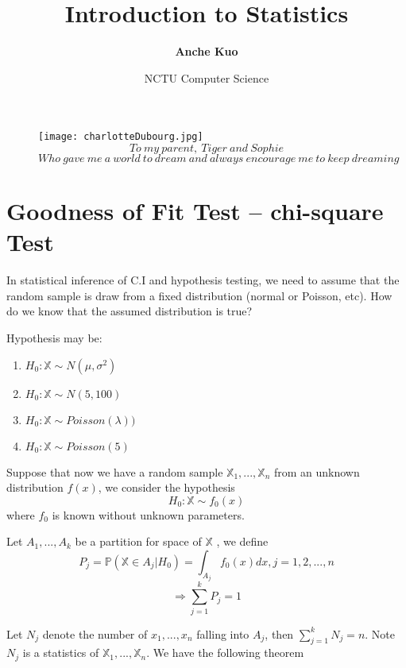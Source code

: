 \documentclass[a4paper,12pt]{article}
\title{\textbf{Introduction to Statistics}}
\author{\textbf{Anche Kuo}}
\date{NCTU Computer Science}
\begin{document}
\maketitle

\begin{figure}[ht!]
\centering
\texttt{[image: charlotteDubourg.jpg]}
\\
$$To\ my\ parent,\ Tiger\ and\ Sophie$$
$$Who\ gave\ me\ a\ world\ to\ dream\ and\ always\ encourage\ me\ to\ keep\ dreaming$$
\label{overflow}
\end{figure}

\newpage
\tableofcontents
\newpage

\newpage

\newpage

\newpage

\newpage

\newpage

\newpage

\newpage

\section{Goodness of Fit Test -- chi-square Test}
In statistical inference of C.I and hypothesis testing, we need to assume that the random sample is draw from a fixed distribution (normal or Poisson, etc). How do we know that the assumed distribution is true?

Hypothesis may be:
\begin{enumerate}
\item $H_0: \mathbb{X} \sim N(\mu, \sigma^2)$
\item $H_0: \mathbb{X} \sim N(5, 100)$
\item $H_0: \mathbb{X} \sim Poisson(\lambda))$
\item $H_0: \mathbb{X} \sim Poisson(5)$
\end{enumerate}

Suppose that now we have a random sample $\mathbb{X}_1, ..., \mathbb{X}_n$ from an unknown distribution $f(x)$, we consider the hypothesis 
$$H_0: \mathbb{X} \sim f_0(x)$$
where $f_0$ is known without unknown parameters.

Let $A_1, ..., A_k$ be a partition for space of $\mathbb{X}$ , we define
$$P_j = \mathbb{P}(\mathbb{X}\in A_j | H_0) = \int_{A_j} f_0(x) dx, j = 1, 2, ..., n$$
$$\Rightarrow \sum_{j=1}^k P_j = 1$$

Let $N_j$ denote the number of $x_1, ..., x_n$ falling into $A_j$, then $\sum_{j=1}^k N_j = n$. Note $N_j$ is a statistics of $\mathbb{X}_1, ..., \mathbb{X}_n$. We have the following theorem
\end{document}
